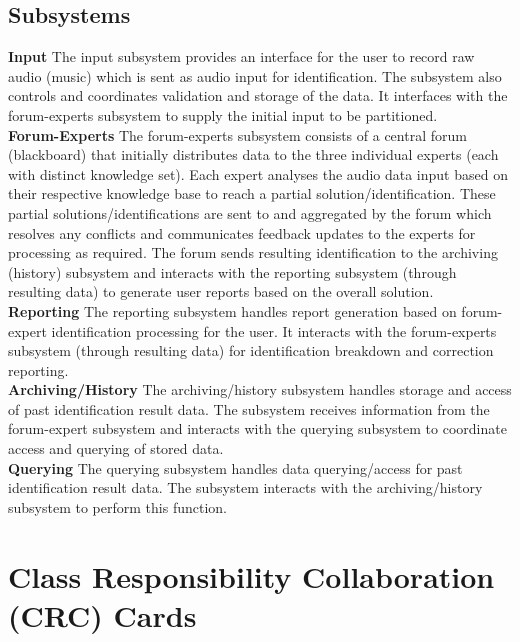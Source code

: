 \documentclass[]{article}
\begin{document}
\subsection{Subsystems}
\label{sub:subsystems}
\textbf{Input} The input subsystem provides an interface for the user to record raw audio (music) which is sent as audio input for identification. The subsystem also controls and coordinates validation and storage of the data. It interfaces with the forum-experts subsystem to supply the initial input to be partitioned. \\
\textbf{Forum-Experts} The forum-experts subsystem consists of a central forum (blackboard) that initially distributes data to the three individual experts (each with distinct knowledge set). Each expert analyses the audio data input based on their respective knowledge base to reach a partial solution/identification. These partial solutions/identifications are sent to and aggregated by the forum which resolves any conflicts and communicates feedback updates to the experts for processing as required. The forum sends resulting identification to the archiving (history) subsystem and interacts with the reporting subsystem (through resulting data) to generate user reports based on the overall solution. \\
\textbf{Reporting} The reporting subsystem handles report generation based on forum-expert identification processing for the user. It interacts with the forum-experts subsystem (through resulting data) for identification breakdown and correction reporting. \\
\textbf{Archiving/History} The archiving/history subsystem handles storage and access of past identification result data. The subsystem receives information from the forum-expert subsystem and interacts with the querying subsystem to coordinate access and querying of stored data.\\
\textbf{Querying} The querying subsystem handles data querying/access for past identification result data. The subsystem interacts with the archiving/history subsystem to perform this function.\\


\newpage	
\section{Class Responsibility Collaboration (CRC) Cards}
\label{sec:class_responsibility_collaboration_crc_cards}
\end{document}
